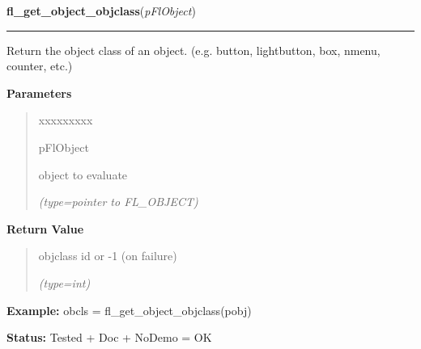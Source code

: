 \hspace{.8\funcindent}\begin{boxedminipage}{\funcwidth}

    \raggedright \textbf{fl\_get\_object\_objclass}(\textit{pFlObject})

    \vspace{-1.5ex}

    \rule{\textwidth}{0.5\fboxrule}
\setlength{\parskip}{2ex}
    Return the object class of an object. (e.g. button, lightbutton, box, 
    nmenu, counter, etc.)

\setlength{\parskip}{1ex}
      \textbf{Parameters}
      \vspace{-1ex}

      \begin{quote}
        \begin{Ventry}{xxxxxxxxx}

          \item[pFlObject]

          object to evaluate

            {\it (type=pointer to FL\_OBJECT)}

        \end{Ventry}

      \end{quote}

      \textbf{Return Value}
    \vspace{-1ex}

      \begin{quote}
      objclass id or -1 (on failure)

      {\it (type=int)}

      \end{quote}

\textbf{Example:} obcls = fl\_get\_object\_objclass(pobj)



\textbf{Status:} Tested + Doc + NoDemo = OK



    \end{boxedminipage}

    \label{xformslib:flbasic:fl_get_object_type}

    \vspace{0.5ex}

